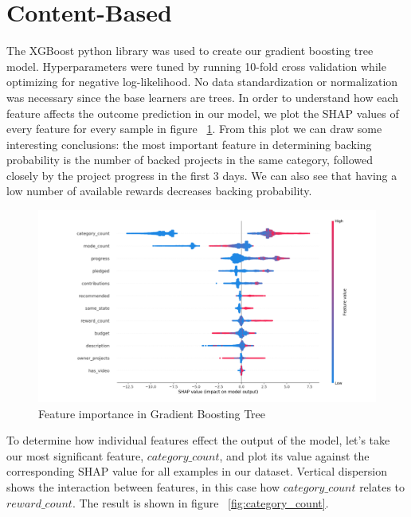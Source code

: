 \documentclass[cic,tc,english]{iiufrgs}
\begin{document}
\section{Content-Based}
The XGBoost python library was used to create our gradient boosting tree model. Hyperparameters were tuned by running 10-fold cross validation while optimizing for negative log-likelihood. No data standardization or normalization was necessary since the base learners are trees. In order to understand how each feature affects the outcome prediction in our model, we plot the SHAP \cite{Lundberg2017} values of every feature for every sample in figure ~\ref{fig:features_importance}. From this plot we can draw some interesting conclusions: the most important feature in determining backing probability is the number of backed projects in the same category, followed closely by the project progress in the first 3 days. We can also see that having a low number of available rewards decreases backing probability.

\begin{figure}
    \caption{Feature importance in Gradient Boosting Tree}
    \begin{center}
        \includegraphics[width=\textwidth]{feature_contribution}
    \end{center}
    \label{fig:features_importance}
\end{figure}

To determine how individual features effect the output of the model, let's take our most significant feature, $category\_count$, and plot its value against the corresponding SHAP value for all examples in our dataset. Vertical dispersion shows the interaction between features, in this case how $category\_count$ relates to $reward\_count$. The result is shown in figure ~\ref{fig:category_count}.
\end{document}
